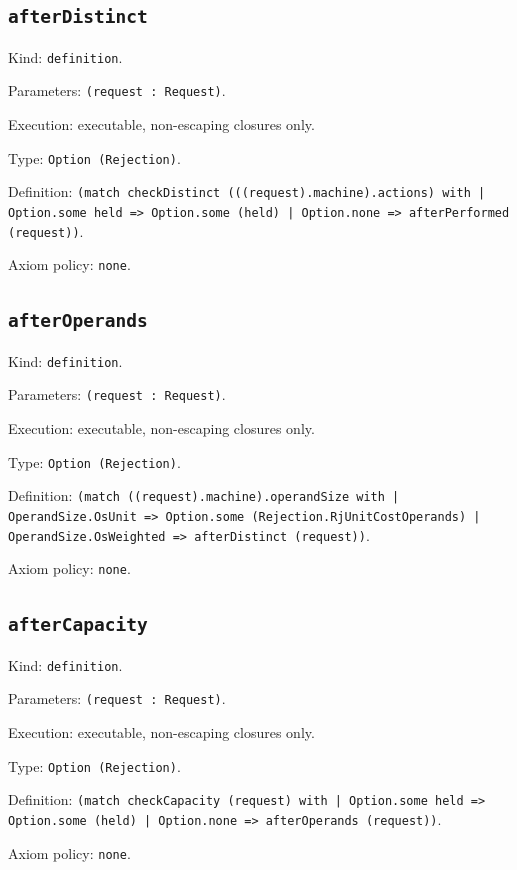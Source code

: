 \documentclass[11pt]{article}
\begin{document}
\subsection*{\texttt{afterDistinct}}
\noindent Kind: \texttt{definition}.\par
\noindent Parameters: \texttt{(request : Request)}.\par
\noindent Execution: executable, non-escaping closures only.\par
\noindent Type: \texttt{Option (Rejection)}.\par
\noindent Definition: \texttt{(match checkDistinct (((request).machine).actions) with | Option.some held => Option.some (held) | Option.none => afterPerformed (request))}.\par
\noindent Axiom policy: \texttt{none}.\par
\subsection*{\texttt{afterOperands}}
\noindent Kind: \texttt{definition}.\par
\noindent Parameters: \texttt{(request : Request)}.\par
\noindent Execution: executable, non-escaping closures only.\par
\noindent Type: \texttt{Option (Rejection)}.\par
\noindent Definition: \texttt{(match ((request).machine).operandSize with | OperandSize.OsUnit => Option.some (Rejection.RjUnitCostOperands) | OperandSize.OsWeighted => afterDistinct (request))}.\par
\noindent Axiom policy: \texttt{none}.\par
\subsection*{\texttt{afterCapacity}}
\noindent Kind: \texttt{definition}.\par
\noindent Parameters: \texttt{(request : Request)}.\par
\noindent Execution: executable, non-escaping closures only.\par
\noindent Type: \texttt{Option (Rejection)}.\par
\noindent Definition: \texttt{(match checkCapacity (request) with | Option.some held => Option.some (held) | Option.none => afterOperands (request))}.\par
\noindent Axiom policy: \texttt{none}.\par
\end{document}
